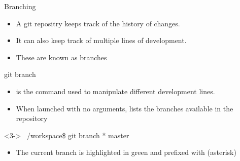 \begin{frame}[fragile]{Branching}
\begin{itemize}[<+->]
	\item   A git repositry keeps track of the history of changes.
    \item   It can also keep track of multiple lines of development.
    \item   These are known as \alert{branches}
\end{itemize}
\end{frame}

\begin{frame}[fragile]{git branch}
    \begin{itemize}[<+->]
        \item {} is the command used to manipulate different development lines.
        \item When launched with no arguments, lists the branches available in the repository
    \end{itemize}
    \begin{shellblock}<3->
~/workspace\$ git branch\inserthitenter
{\color{white}*} master
\end{shellblock}
    \begin{itemize}[<4->]
        \item The current branch is highlighted in green and prefixed with \code{*} (asterisk)
    \end{itemize}
\end{frame}

